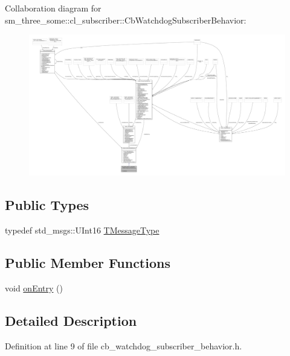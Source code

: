 Collaboration diagram for sm\+\_\+three\+\_\+some\+:\+:cl\+\_\+subscriber\+:\+:Cb\+Watchdog\+Subscriber\+Behavior\+:
\nopagebreak
\begin{figure}[H]
\begin{center}
\leavevmode
\includegraphics[width=350pt]{classsm__three__some_1_1cl__subscriber_1_1CbWatchdogSubscriberBehavior__coll__graph}
\end{center}
\end{figure}
\subsection*{Public Types}
\begin{DoxyCompactItemize}
\item 
typedef std\+\_\+msgs\+::\+U\+Int16 \hyperlink{classsm__three__some_1_1cl__subscriber_1_1CbWatchdogSubscriberBehavior_a2310463e68d0999f13ccc9f16ceaf3fe}{T\+Message\+Type}
\end{DoxyCompactItemize}
\subsection*{Public Member Functions}
\begin{DoxyCompactItemize}
\item 
void \hyperlink{classsm__three__some_1_1cl__subscriber_1_1CbWatchdogSubscriberBehavior_a6bd938abf54a95555182345a5e53cafe}{on\+Entry} ()
\end{DoxyCompactItemize}


\subsection{Detailed Description}


Definition at line 9 of file cb\+\_\+watchdog\+\_\+subscriber\+\_\+behavior.\+h.



